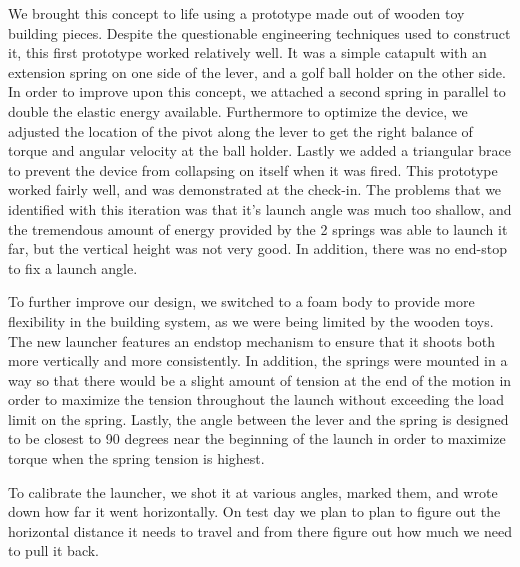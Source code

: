 \documentclass{article}
\begin{document}
We brought this concept to life using a prototype made out of wooden toy building pieces.
Despite the questionable engineering techniques used to construct it, this first prototype worked relatively well. It was a simple catapult with an extension spring on one side of the lever, and a golf ball holder on the other side. In order to improve upon this concept, we attached a second spring in parallel to double the elastic energy available. Furthermore to optimize the device, we adjusted the location of the pivot along the lever to get the right balance of torque and angular velocity at the ball holder. Lastly we added a triangular brace to prevent the device from collapsing on itself when it was fired. This prototype worked fairly well, and was demonstrated at the check-in. The problems that we identified with this iteration was that it's launch angle was much too shallow, and the tremendous amount of energy provided by the 2 springs was able to launch it far, but the vertical height was not very good. In addition, there was no end-stop to fix a launch angle. 


To further improve our design, we switched to a foam body to provide more flexibility in the building system, as we were being limited by the wooden toys. The new launcher features an endstop mechanism to ensure that it shoots both more vertically and more consistently. In addition, the springs were mounted in a way so that there would be a slight amount of tension at the end of the motion in order to maximize the tension throughout the launch without exceeding the load limit on the spring. Lastly, the angle between the lever and the spring is designed to be closest to 90 degrees near the beginning of the launch in order to maximize torque when the spring tension is highest.


To calibrate the launcher, we shot it at various angles, marked them, and wrote down how far it went horizontally. On test day we plan to plan to figure out the horizontal distance it needs to travel and from there figure out how much we need to pull it back.
\end{document}
